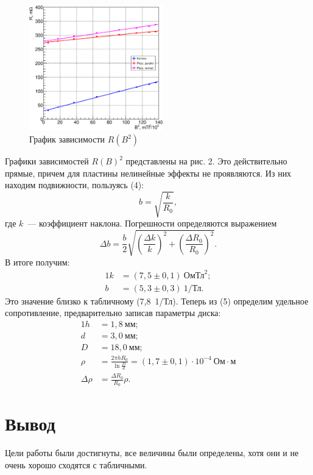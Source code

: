 \documentclass[12pt,a4paper]{article}
\begin{document}
\begin{figure}
\vspace{-20pt}
\centering\includegraphics[width = 0.52\textwidth]{Plot2}
\captionsetup{justification = centering}
\caption{График зависимости $R(B^2)$\label{Fig3}}
\vspace{-20pt}
\end{figure}

\noindent Графики зависимостей $R\left(B\right)^2$ представлены на рис. 2. Это действительно прямые, причем для пластины нелинейные эффекты не проявляются. Из них находим подвижности, пользуясь (4):
\begin{equation}
b = \sqrt{\frac{k}{R_0}},
\end{equation}
где $k$~--- коэффициент наклона. Погрешности определяются выражением
\begin{equation}
\Delta b = \frac{b}{2}\sqrt{\left(\frac{\Delta k}{k}\right)^2 + \left(\frac{\Delta R_0}{R_0}\right)^2}.
\end{equation}
В итоге получим:
\begin{alignat}{1}
k &= (7,5 \pm 0,1)~\text{Ом} \text{Тл}^2; \\
b &= (5,3 \pm 0,3)~\text{1/Тл}.
\end{alignat}
Это значение близко к табличному (7,8~1/Тл). Теперь из (5) определим удельное сопротивление, предварительно записав параметры диска:
\begin{alignat}{1}
h &= 1,8~\text{мм};\\
d &= 3,0~\text{мм};\\
D &= 18,0~\text{мм};\\
\rho &= \frac{2\pi h R_0}{\ln \frac{D}{d}} = (1,7 \pm 0,1)\cdot 10^{-4}~\text{Ом}\cdot\text{м}\\
\Delta \rho &= \frac{\Delta R_0}{R_0} \rho.
\end{alignat}
\section{Вывод}
Цели работы были достигнуты, все величины были определены, хотя они и не очень хорошо сходятся с табличными.
\end{document}
